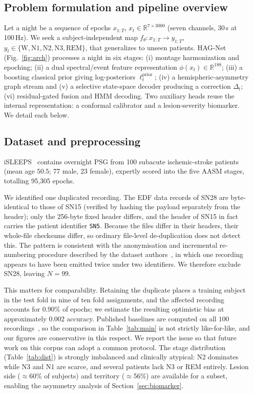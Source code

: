 \documentclass[journal]{IEEEtran}
\begin{document}
\subsection{Problem formulation and pipeline overview}
Let a night be a sequence of epochs $x_{1:T}$, $x_t\in\mathbb{R}^{7\times3000}$
(seven channels, 30\,s at 100\,Hz). We seek a subject-independent map
$f_\theta:x_{1:T}\!\rightarrow\!y_{1:T}$, $y_t\in\{\mathrm{W,N1,N2,N3,REM}\}$, that
generalizes to unseen patients. HAG-Net (Fig.~\ref{fig:arch}) processes a night in
six stages: (i) montage harmonization and epoching; (ii) a dual spectral/event
feature representation $\phi(x_t)\in\mathbb{R}^{188}$; (iii) a boosting classical
prior giving log-posteriors $\ell^{\mathrm{prior}}_t$; (iv) a hemispheric-asymmetry
graph stream and (v) a selective state-space decoder producing a correction
$\Delta_t$; (vi) residual-gated fusion and HMM decoding. Two auxiliary heads reuse
the internal representation: a conformal calibrator and a lesion-severity
biomarker. We detail each below.

\subsection{Dataset and preprocessing}
iSLEEPS~\cite{maiti2026isleeps} contains overnight PSG from 100 subacute
ischemic-stroke patients (mean age $50.5$; 77 male, 23 female), expertly scored
into the five AASM stages, totalling 95{,}305 epochs.

We identified one duplicated recording. The EDF data records of SN28 are
byte-identical to those of SN15 (verified by hashing the payload separately from the
header); only the 256-byte fixed header differs, and the header of SN15 in fact
carries the patient identifier \texttt{SN5}. Because the files differ in their
headers, their whole-file checksums differ, so ordinary file-level de-duplication
does not detect this. The pattern is consistent with the anonymisation and
incremental re-numbering procedure described by the dataset
authors~\cite{maiti2026isleeps}, in which one recording appears to have been emitted
twice under two identifiers. We therefore exclude SN28, leaving $N=99$.

This matters for comparability. Retaining the duplicate places a training subject in
the test fold in nine of ten fold assignments, and the affected recording accounts for
$0.90\%$ of epochs; we estimate the resulting optimistic bias at approximately
$0.002$ accuracy. Published baselines are computed on all $100$
recordings~\cite{maiti2026isleeps}, so the comparison in Table~\ref{tab:main} is not
strictly like-for-like, and our figures are conservative in this respect. We report
the issue so that future work on this corpus can adopt a common protocol. The stage
distribution
(Table~\ref{tab:dist}) is strongly imbalanced and clinically atypical: N2 dominates
while N3 and N1 are scarce, and several patients lack N3 or REM entirely. Lesion
side ($\approx$60\% of subjects) and territory ($\approx$56\%) are available for a
subset, enabling the asymmetry analysis of Section~\ref{sec:biomarker}.
\end{document}
